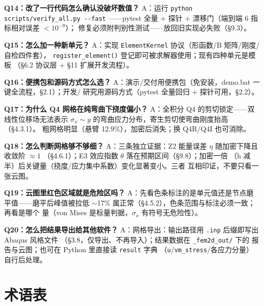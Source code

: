 \documentclass[12pt,a4paper]{ctexart}
\newcommand{\fem}{\Verb}
\begin{document}
\textbf{Q14：改了一行代码怎么确认没破坏数值？}
A：运行\newline
\fem|python scripts/verify_all.py --fast|
——pytest 全量 + 探针 + 漂移门（端到端 6 指标相对误差 $<10^{-9}$）；
修复必须附判别性测试——放回旧实现必失败（§9.3）。

\textbf{Q15：怎么加一种新单元？}
A：实现 \fem|ElementKernel| 协议（形函数/B 矩阵/刚度/自检四件套），
\fem|register_element()| 登记即可被求解器使用；现有四种单元是模板
（§6.2 协议层 + §11 扩展开发流程）。

\textbf{Q16：便携包和源码方式怎么选？}
A：演示/交付用便携包（免安装，demo.bat 一键全流程，§2.1）；开发/
研究用源码方式（pytest 全量回归 + 探针可用，§2.2）。

\textbf{Q17：为什么 Q4 网格在纯弯曲下挠度偏小？}
A：全积分 Q4 的剪切锁定——双线性位移场无法表示
$\sigma_x \sim y$ 的弯曲应力分布，寄生剪切使弯曲刚度抬高（§4.3.1）。
粗网格明显（悬臂 12.9\%），加密后消失；换 Q4R/Q4I 也可消除。

\textbf{Q18：怎么判断网格够不够细？}
A：三条独立证据：Z2 能量误差 $\eta$ 随加密下降且收敛阶 $\approx 1$
（§4.6.1）；E3 效应指数 $\theta$ 落在预期区间（§9.8）；加密一倍
（h 减半）后关键量（挠度/应力集中系数）变化显著变小。三者
互相印证，不要只看一张云图。

\textbf{Q19：云图里红色区域就是危险区吗？}
A：先看色条标注的是单元值还是节点磨平值——磨平后峰值被拉低
$\sim$17\% 属正常（§4.5.2），色条范围与标注必须一致；再看是哪个
量（von Mises 是标量判据，$\sigma_x$ 有符号无危险性）。

\textbf{Q20：怎么把结果导出给其他软件？}
A：网格导出：输出路径用 \fem|.inp| 后缀即写出 Abaqus 风格文件
（§3.8，仅导出、不再导入）；结果数据在 \fem|_fem2d_out/| 下的
报告与云图；也可在 Python 里直接读 \fem|result| 字典
（\fem|u|/\fem|vm_stress|/各应力分量）自行后处理。

\section{术语表}
\end{document}

